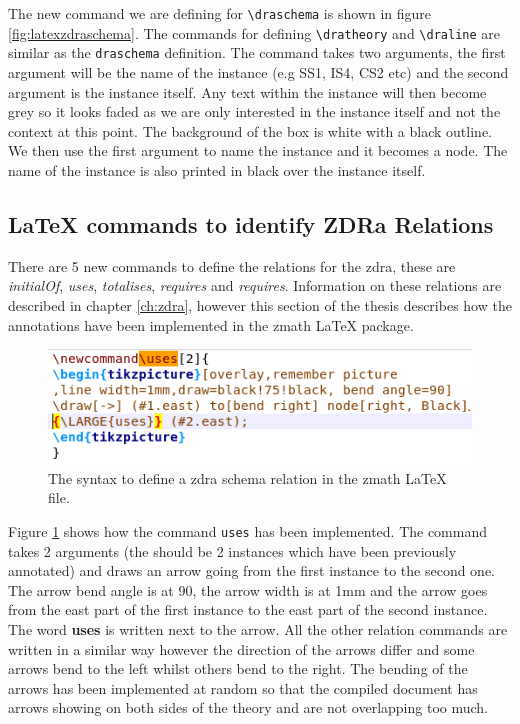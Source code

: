 The new command we are defining for \verb|\draschema| is shown in figure \ref{fig:latexzdraschema}. The commands for defining \verb|\dratheory| and \verb|\draline| are similar as the \verb|draschema| definition. The command takes two arguments, the first argument will be the name of the instance (e.g SS1, IS4, CS2 etc) and the second argument is the instance itself. Any text within the instance will then become grey so it looks faded as we are only interested in the instance itself and not the context at this point. The background of the box is white with a black outline. We then use the first argument to name the instance and it becomes a node. The name of the instance is also printed in black over the instance itself.

\subsection{\LaTeX{} commands to identify ZDRa Relations}

There are 5 new commands to define the relations for the \gls{zdra}, these are \emph{initialOf}, \emph{uses}, \emph{totalises}, \emph{requires} and \emph{requires}. Information on these relations are described in chapter \ref{ch:zdra}, however this section of the thesis describes how the annotations have been implemented in the \gls{zmath} \LaTeX{} package.

\begin{figure}[H]
\includegraphics[scale=0.7]{Figures/Design/zmathd.png}
\caption{The syntax to define a \gls{zdra} schema relation in the \gls{zmath} \LaTeX{} file. \label{fig:latexzdrauses}}
\end{figure}

Figure \ref{fig:latexzdrauses} shows how the command \verb|uses| has been implemented. The command takes 2 arguments (the should be 2 instances which have been previously annotated) and draws an arrow going from the first instance to the second one. The arrow bend angle is at 90, the arrow width is at 1mm and the arrow goes from the east part of the first instance to the east part of the second instance. The word \textbf{uses} is written next to the arrow. All the other relation commands are written in a similar way however the direction of the arrows differ and some arrows bend to the left whilst others bend to the right. The bending of the arrows has been implemented at random so that the compiled document has arrows showing on both sides of the theory and are not overlapping too much.

